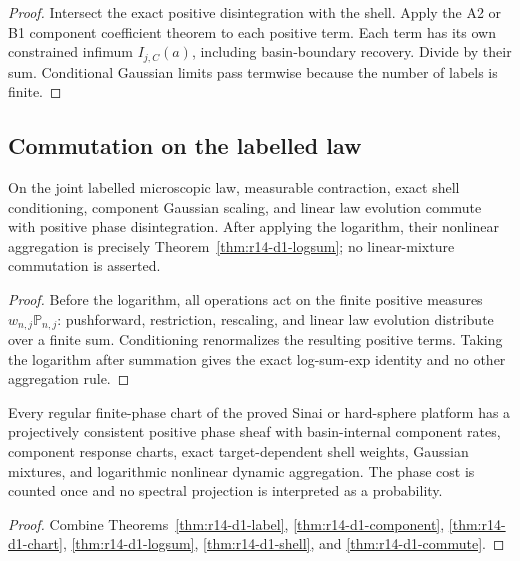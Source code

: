 \begin{proof}
Intersect the exact positive disintegration with the shell.  Apply the A2 or
B1 component coefficient theorem to each positive term.  Each term has its
own constrained infimum \(I_{j,C}(a)\), including basin-boundary recovery.
Divide by their sum.  Conditional Gaussian limits pass termwise because the
number of labels is finite.
\end{proof}

\subsection{Commutation on the labelled law}

\begin{theorem}
\label{thm:r14-d1-commute}
On the joint labelled microscopic law, measurable contraction, exact shell
conditioning, component Gaussian scaling, and linear law evolution commute
with positive phase disintegration.  After applying the logarithm, their
nonlinear aggregation is precisely
Theorem~\ref{thm:r14-d1-logsum}; no linear-mixture commutation is asserted.
\end{theorem}

\begin{proof}
Before the logarithm, all operations act on the finite positive measures
\(w_{n,j}\mathbb P_{n,j}\): pushforward, restriction, rescaling, and linear
law evolution distribute over a finite sum.  Conditioning renormalizes the
resulting positive terms.  Taking the logarithm after summation gives the
exact log-sum-exp identity and no other aggregation rule.
\end{proof}

\begin{theorem}
\label{thm:r14-d1-main}
Every regular finite-phase chart of the proved Sinai or hard-sphere platform
has a projectively consistent positive phase sheaf with basin-internal
component rates, component response charts, exact target-dependent shell
weights, Gaussian mixtures, and logarithmic nonlinear dynamic aggregation.
The phase cost is counted once and no spectral projection is interpreted as
a probability.
\end{theorem}

\begin{proof}
Combine Theorems~\ref{thm:r14-d1-label},
\ref{thm:r14-d1-component}, \ref{thm:r14-d1-chart},
\ref{thm:r14-d1-logsum}, \ref{thm:r14-d1-shell}, and
\ref{thm:r14-d1-commute}.
\end{proof}
